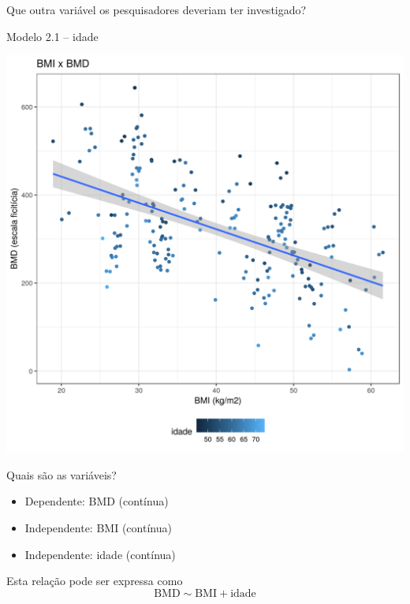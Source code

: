 \documentclass{beamer}
\begin{document}
\begin{frame}
  \begin{center}
    Que outra variável os pesquisadores deveriam ter investigado?
  \end{center}
\end{frame}

\begin{frame}{\small Modelo 2.1 -- idade}
  \begin{center}
    \includegraphics[height=.9\textheight]{Cap31-32/pratica-rlm2_1}
  \end{center}
\end{frame}

\begin{frame}{Quais são as variáveis?}
  \begin{itemize}
  \item Dependente: BMD (contínua)
  \item Independente: BMI (contínua)
  \item Independente: idade (contínua)
  \end{itemize}
  \vfill
  \begin{block}{Esta relação pode ser expressa como}
    \begin{displaymath}
      \text{BMD} \sim \text{BMI} + \text{idade}
    \end{displaymath}
  \end{block}
\end{frame}
\end{document}
